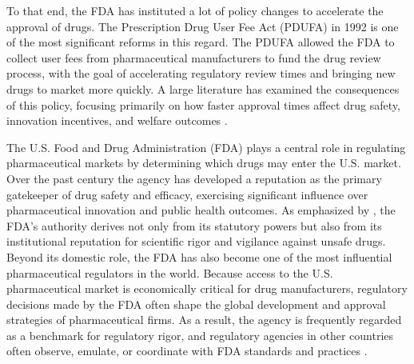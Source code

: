 To that end, the FDA has instituted a lot of policy changes to accelerate the approval of drugs. The Prescription Drug User Fee Act (PDUFA) in 1992 is one of the most significant reforms in this regard. The PDUFA allowed the FDA to collect user fees from pharmaceutical manufacturers to fund the drug review process, with the goal of accelerating regulatory review times and bringing new drugs to market more quickly. A large literature has examined the consequences of this policy, focusing primarily on how faster approval times affect drug safety, innovation incentives, and welfare outcomes \parencite{olsonRiskWeBear2008}.






The U.S. Food and Drug Administration (FDA) plays a central role in regulating pharmaceutical markets by determining which drugs may enter the U.S. market. Over the past century the agency has developed a reputation as the primary gatekeeper of drug safety and efficacy, exercising significant influence over pharmaceutical innovation and public health outcomes. As emphasized by \textcite{carpenterINTRODUCTIONGatekeeper2010}, the FDA’s authority derives not only from its statutory powers but also from its institutional reputation for scientific rigor and vigilance against unsafe drugs. Beyond its domestic role, the FDA has also become one of the most influential pharmaceutical regulators in the world. Because access to the U.S. pharmaceutical market is economically critical for drug manufacturers, regulatory decisions made by the FDA often shape the global development and approval strategies of pharmaceutical firms. As a result, the agency is frequently regarded as a benchmark for regulatory rigor, and regulatory agencies in other countries often observe, emulate, or coordinate with FDA standards and practices \parencite{carpenterAmericanPharmaceuticalRegulation2010}.

